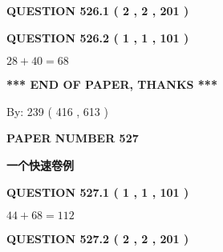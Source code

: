 \documentclass{ctexart}
\begin{document}
{\textbf{\Large{QUESTION
526.1 
 ( 2 , 2 , 201 )
}}}
  
  
  
\vspace{0.2in}
  
{\textbf{\Large{QUESTION
526.2 
 ( 1 , 1 , 101 )
}}}
  
  
 
 

$ %
28 +  %
40=   %
68$
 
 
   
   
 \vspace{0.2in}
 
   
   
   
   
\vspace{1.0in} 
{\textbf{\large{ *** END OF PAPER, THANKS *** }}} 
   
   
\hspace{1.0in} By: 
 239 ( 416 ,  613 )
   
   
   
   
\newpage 
\setcounter{page}{ 
   527001 } 
   
   
   
   
 {\textbf{ \Large{ PAPER NUMBER  527  }}}
   
   
\vspace{0.2in}
   
   
   
   
   
   
 \vspace{0.2in}
{\LARGE {\textbf{ 一个快速卷例}}}
   
   
  
\vspace{0.2in}
  
{\textbf{\Large{QUESTION
527.1 
 ( 1 , 1 , 101 )
}}}
  
  
 
 

$ %
44 +  %
68=   %
112$
 
 
  
\vspace{0.2in}
  
{\textbf{\Large{QUESTION
527.2 
 ( 2 , 2 , 201 )
}}}
  
  
   
   
 \vspace{0.2in}
 
   
   
\end{document}
